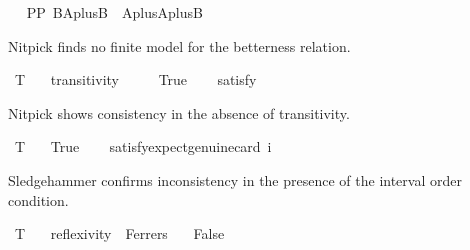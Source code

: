 \begin{isabellebody}
\ %
\isanewline
\ PP{}{\isacharcolon}{\kern0pt}\ {\isachardoublequoteopen}{\isasymlfloor}{\isacharparenleft}{\kern0pt}\isactrlbold {\isasymnot}{\isasymcircle}{\isacharless}{\kern0pt}\isactrlbold {\isasymnot}B{\isacharbar}{\kern0pt}Aplus\isactrlbold {\isasymor}B{\isachargreater}{\kern0pt}\ \isactrlbold {\isasymand}\ {\isasymcircle}{\isacharless}{\kern0pt}\isactrlbold {\isasymnot}Aplus{\isacharbar}{\kern0pt}Aplus\isactrlbold {\isasymor}B{\isachargreater}{\kern0pt}{\isacharparenright}{\kern0pt}{\isasymrfloor}{\isachardoublequoteclose}%
\begin{isamarkuptext}%
Nitpick finds no finite model for the betterness 
   relation.%
\end{isamarkuptext}\isamarkuptrue%
\isamarkupfalse%
\ T{}{\isacharcolon}{\kern0pt}\isanewline
\ \ \ transitivity\ \ \isanewline
\ \ \ True\isanewline
\ \ \isamarkupfalse%
\ {\isacharbrackleft}{\kern0pt}satisfy{\isacharbrackright}{\kern0pt}\ %
\isanewline
%
\isadelimproof
\ \ %
\endisadelimproof
%
\isatagproof
{}\isamarkupfalse%
%
\endisatagproof
{\isafoldproof}%
%
\isadelimproof
%
\endisadelimproof
%
\begin{isamarkuptext}%
Nitpick shows consistency in the absence of transitivity.%
\end{isamarkuptext}\isamarkuptrue%
\isamarkupfalse%
\ T{}{\isacharcolon}{\kern0pt}\isanewline
\ \ \ True\isanewline
\ \ \isamarkupfalse%
\ {\isacharbrackleft}{\kern0pt}satisfy{\isacharcomma}{\kern0pt}expect{\isacharequal}{\kern0pt}genuine{\isacharcomma}{\kern0pt}card\ i{\isacharequal}{\kern0pt}{}{\isacharbrackright}{\kern0pt}\ \ %
\isanewline
%
\isadelimproof
\ \ %
\endisadelimproof
%
\isatagproof
{}\isamarkupfalse%
%
\endisatagproof
{\isafoldproof}%
%
\isadelimproof
%
\endisadelimproof
%
\begin{isamarkuptext}%
Sledgehammer confirms inconsistency in the presence of the interval order condition.%
\end{isamarkuptext}\isamarkuptrue%
\isamarkupfalse%
\ T{}{\isacharcolon}{\kern0pt}\isanewline
\ \ \ reflexivity\ \ Ferrers\isanewline
\ \ \ False\isanewline
\ \ %
\isanewline
%
\isadelimproof
\ \ %
\endisadelimproof

\end{isabellebody}
